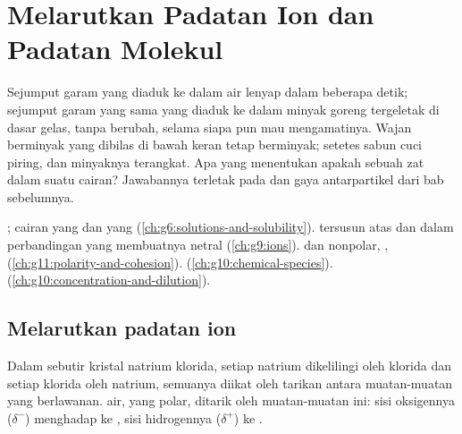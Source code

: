 \chapter{Melarutkan Padatan Ion dan Padatan Molekul}\label{ch:g11:dissolution}

Sejumput garam yang diaduk ke dalam air lenyap dalam beberapa detik;
sejumput garam yang sama yang diaduk ke dalam minyak goreng tergeletak di
dasar gelas, tanpa berubah, selama siapa pun mau mengamatinya. Wajan
berminyak yang dibilas di bawah keran tetap berminyak; setetes sabun cuci
piring, dan minyaknya terangkat. Apa yang menentukan apakah sebuah zat
 dalam suatu cairan? Jawabannya terletak pada  dan
gaya antarpartikel dari bab sebelumnya.

\begin{recall}
; cairan yang  dan yang 
(\cref{ch:g6:solutions-and-solubility}).  tersusun atas
 dan  dalam perbandingan yang membuatnya netral
(\cref{ch:g9:ions}).  dan nonpolar, ,
 (\cref{ch:g11:polarity-and-cohesion}).
 (\cref{ch:g10:chemical-species}). 
(\cref{ch:g10:concentration-and-dilution}).
\end{recall}

\section{Melarutkan padatan ion}

Dalam sebutir kristal natrium klorida, setiap  natrium 
dikelilingi oleh  klorida  dan setiap  klorida oleh
 natrium, semuanya diikat oleh tarikan antara muatan-muatan yang
berlawanan.  air, yang polar, ditarik oleh muatan-muatan
ini: sisi oksigennya ($\delta^-$) menghadap ke , sisi hidrogennya
($\delta^+$) ke .

